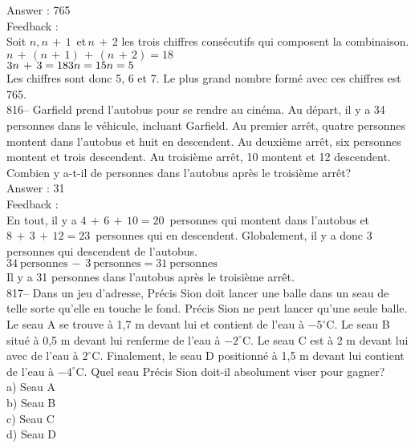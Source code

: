 ﻿\documentclass[letterpaper, 12pt]{article}
\begin{document}
Answer : 765\\

Feedback : \\
Soit $n, n\,+\,1\,$ et$\, n\,+\,2$ les trois chiffres cons\'ecutifs qui
composent la combinaison.  \\
$n\,+\,\left( n\,+\,1\right) \,+\,\left( n\,+\,2\right) = 18$\\
$3n\,+\,3=18\\
3n=15\\
n=5$\\
Les chiffres sont donc 5, 6 et 7.  Le plus grand nombre form\'e avec ces
chiffres est 765.\\


816-- Garfield prend l'autobus pour se rendre au cin\'ema.  Au d\'epart, il
y a 34 personnes dans le v\'ehicule, incluant Garfield.  Au premier arr\^et,
quatre personnes montent dans l'autobus et huit en descendent.  Au
deuxi\`eme arr\^et, six personnes montent et trois descendent.  Au
troisi\`eme arr\^et, 10 montent et 12 descendent.  Combien y a-t-il de
personnes dans l'autobus apr\`es le troisi\`eme arr\^et?\\

Answer : 31\\

Feedback : \\
En tout, il y a $4\,+\,6\,+\,10=20$~personnes qui montent dans l'autobus et
$8\,+\,3\,+\,12=23$~personnes qui en descendent.  Globalement, il y a donc 3
personnes qui descendent de l'autobus.  \\
$34~\textrm{personnes}\,-\,3~\textrm{personnes}=31~\textrm{personnes}$ \\
Il y a 31 personnes dans l'autobus apr\`es le troisi\`eme arr\^et.\\

817-- Dans un jeu d'adresse, Pr\'ecis Sion doit lancer une balle dans un
seau de telle sorte qu'elle en touche le fond.  Pr\'ecis Sion ne peut lancer
qu'une seule balle.  Le seau A se trouve \`a 1,7 m devant lui et contient de
l'eau \`a $-5^{\circ}$C.  Le seau B situ\'e \`a 0,5 m devant lui renferme de
l'eau \`a $-2^{\circ}$C.  Le seau C est \`a 2 m devant lui avec de l'eau \`a
$2^{\circ}$C.  Finalement, le seau D positionn\'e \`a 1,5 m devant lui
contient de l'eau \`a $-4^{\circ}$C.  Quel seau Pr\'ecis Sion doit-il
absolument viser pour gagner?\\
a) Seau A\\
b) Seau B\\
c) Seau C\\
d) Seau D\\
\end{document}
